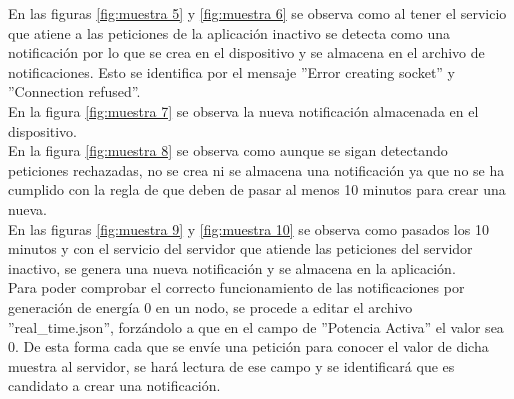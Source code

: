 En las figuras \ref{fig:muestra 5} y \ref{fig:muestra 6} se observa como al tener el servicio que atiene a las peticiones de la aplicación inactivo se detecta como una notificación por lo que se crea en el dispositivo y se almacena en el archivo de notificaciones. Esto se identifica por el mensaje ''Error creating socket'' y ''Connection refused''.
\\ \newline
En la figura \ref{fig:muestra 7} se observa la nueva notificación almacenada en el dispositivo.
\\ \newline
En la figura \ref{fig:muestra 8} se observa como aunque se sigan detectando peticiones rechazadas, no se crea ni se almacena una notificación ya que no se ha cumplido con la regla de que deben de pasar al menos 10 minutos para crear una nueva.
\\ \newline
En las figuras \ref{fig:muestra 9} y \ref{fig:muestra 10} se observa como pasados los 10 minutos y con el servicio del servidor que atiende las peticiones del servidor inactivo, se genera una nueva notificación y se almacena en la aplicación.
\\ \newline
Para poder comprobar el correcto funcionamiento de las notificaciones por generación de energía 0 en un nodo, se procede a editar el archivo ''real\_time.json'', forzándolo a que en el campo de ''Potencia Activa'' el valor sea 0. De esta forma cada que se envíe una petición para conocer el valor de dicha muestra al servidor, se hará lectura de ese campo y se identificará que es candidato a crear una notificación.

